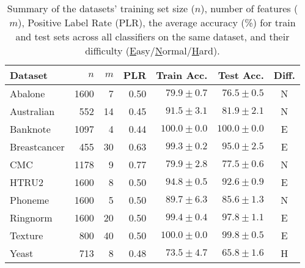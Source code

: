 \begin{table}[t!]
    \footnotesize
    \centering
    \caption{Summary of the datasets' training set size ($n$), number of features ($m$), Positive Label Rate (PLR), the average accuracy (\%) for train and test sets across all classifiers on the same dataset, and their difficulty (\underline{E}asy/\underline{N}ormal/\underline{H}ard). 
    }
    \begin{tabular}{l|r|r|r|r|r|c}
        \toprule
        Dataset      & $n$  & $m$ & PLR  & Train Acc. & Test Acc. & Diff. \\
        \midrule                                                                 
        Abalone      & 1600 & 7   & 0.50 & $79.9\pm0.7$ &  $76.5\pm0.5$     & N \\
        Australian   & 552  & 14  & 0.45 & $91.5\pm3.1$ &  $81.9\pm2.1$     & N \\
        Banknote     & 1097 & 4   & 0.44 & $100.0\pm0.0$ & $100.0\pm0.0$    & E \\
        Breastcancer & 455  & 30  & 0.63 & $99.3\pm0.2$ &  $95.0\pm2.5$     & E \\
        CMC          & 1178 & 9   & 0.77 & $79.9\pm2.8$ &  $77.5\pm0.6$     & N \\
        HTRU2        & 1600 & 8   & 0.50 & $94.8\pm0.5$ &  $92.6\pm0.9$     & E \\
        Phoneme      & 1600 & 5   & 0.50 & $89.7\pm6.3$ &  $85.6\pm1.3$     & N \\
        Ringnorm     & 1600 & 20  & 0.50 & $99.4\pm0.4$ &  $97.8\pm1.1$     & E \\
        Texture      & 800  & 40  & 0.50 & $100.0\pm0.0$ &  $99.8\pm0.5$    & E \\
        Yeast        & 713  & 8   & 0.48 & $73.5\pm4.7$ &  $65.8\pm1.6$     & H \\
        \bottomrule
    \end{tabular}
    \label{tab.datasets}
\end{table}


